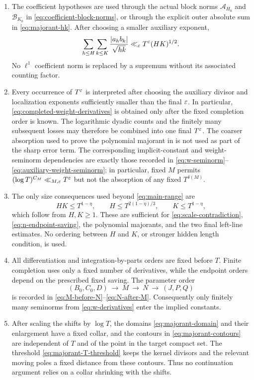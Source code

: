 \begin{enumerate}[label=\textup{D\arabic*.},leftmargin=10mm]
\item
The coefficient hypotheses are used through the actual block norms
$\mathcal A_{H_0}$ and $\mathcal B_{K_0}$ in
\eqref{eq:coefficient-block-norms}, or through the explicit outer absolute
sum in \eqref{eq:majorant-hk}.  After choosing a smaller auxiliary exponent,
\[
 \sum_{h\leq H}\sum_{k\leq K}
 \frac{|a_hb_k|}{\sqrt{hk}}
 \ll_\varepsilon T^\varepsilon(HK)^{1/2}.
\]
No $\ell^1$ coefficient norm is replaced by a supremum without its associated
counting factor.

\item
Every occurrence of $T^\varepsilon$ is interpreted after choosing the auxiliary
divisor and localization exponents sufficiently smaller than the final
$\varepsilon$.  In particular, \eqref{eq:completed-weight-derivatives} is obtained
only after the fixed completion order is known.  The logarithmic dyadic
counts and the finitely many subsequent losses may therefore be combined
into one final $T^\varepsilon$.  The coarser absorption used to prove the polynomial
majorant in  is not used as part of the
sharp error term.  The corresponding implicit-constant and weight-seminorm
dependencies are exactly those recorded in
\eqref{eq:w-seminorm}--\eqref{eq:auxiliary-weight-seminorm}; in particular,
fixed $M$ permits $(\log T)^{C_M}\ll_{M,\varepsilon}T^\varepsilon$ but not the absorption of
any fixed $T^{\delta(M)}$.

\item
The only size consequences used beyond \eqref{eq:main-range} are
\[
 HK\leq T^{1-\eta},\qquad
 H\leq T^{2(1-\eta)/3},\qquad
 K\leq T^{1-\eta},
\]
which follow from $H,K\geq1$.  These are sufficient for
\eqref{eq:scale-contradiction}, \eqref{eq:n-endpoint-saving}, the polynomial
majorants, and the two final left-line estimates.  No ordering between $H$
and $K$, or stronger hidden length condition, is used.

\item
All differentiation and integration-by-parts orders are fixed before $T$.
Finite completion uses only a fixed number of derivatives, while the endpoint
orders depend on the prescribed fixed saving.  The parameter order
\[
 (B_0,C_0,D)\ \longrightarrow\ M\ \longrightarrow\ N\
 \longrightarrow\ (J,P,Q)
\]
is recorded in \eqref{eq:M-before-N}--\eqref{eq:N-after-M}.  Consequently
only finitely many seminorms from \eqref{eq:w-derivatives} enter the implied
constants.

\item
After scaling the shifts by $\log T$, the domains
\eqref{eq:majorant-domain} and their enlargement have a fixed collar, and
the contours in \eqref{eq:majorant-contours} are independent of $T$ and of
the point in the target compact set.  The threshold
\eqref{eq:majorant-T-threshold} keeps the kernel divisors and the relevant
moving poles a fixed distance from these contours.  Thus no continuation
argument relies on a collar shrinking with the shifts.


\end{enumerate}
